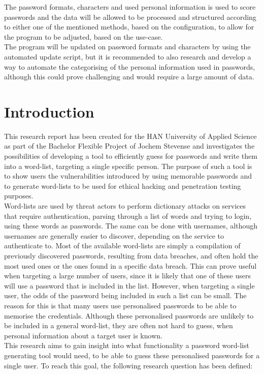 \documentclass[a4paper,12pt]{article}
\begin{document}
The password formats, characters and used personal information is used to score passwords and the data will be allowed to be processed and structured according to either one of the mentioned methods, based on the configuration, to allow for the program to be adjusted, based on the use-case.\\
The program will be updated on password formats and characters by using the automated update script, but it is recommended to also research and develop a way to automate the categorising of the personal information used in passwords, although this could prove challenging and would require a large amount of data.

\newpage
  
\tableofcontents

\newpage
\section{Introduction}
\label{ch:intro}
This research report has been created for the HAN University of Applied Science as part of the Bachelor Flexible Project of Jochem Stevense and investigates the possibilities of developing a tool to efficiently guess for passwords and write them into a word-list, targeting a single specific person. The purpose of such a tool is to show users the vulnerabilities introduced by using memorable passwords and to generate word-lists to be used for ethical hacking and penetration testing purposes.\\

Word-lists are used by threat actors to perform dictionary attacks on services that require authentication, parsing through a list of words and trying to login, using these words as passwords. The same can be done with usernames, although usernames are generally easier to discover, depending on the service to authenticate to. Most of the available word-lists are simply a compilation of previously discovered passwords, resulting from data breaches, and often hold the most used ones or the ones found in a specific data breach. This can prove useful when targeting a large number of users, since it is likely that one of these users will use a password that is included in the list. However, when targeting a single user, the odds of the password being included in such a list can be small. The reason for this is that many users use personalised passwords to be able to memorise the credentials. Although these personalised passwords are unlikely to be included in a general word-list, they are often not hard to guess, when personal information about a target user is known.\\
This research aims to gain insight into what functionality a password word-list generating tool would need, to be able to guess these personalised passwords for a single user. To reach this goal, the following research question has been defined:\\
\end{document}
